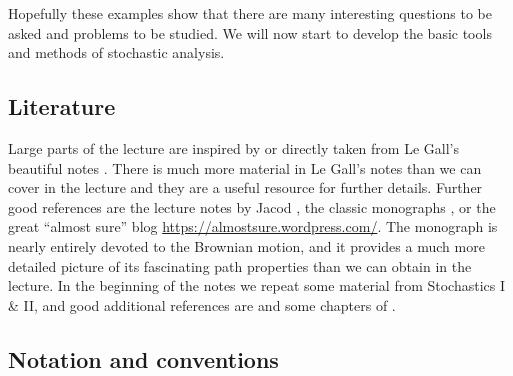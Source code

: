 \documentclass{article}
\newcommand{\1}{\1}
\begin{document}
Hopefully these examples show that there are many interesting questions to be
asked and problems to be studied. We will now start to develop the basic tools
and methods of stochastic analysis.

\subsection*{Literature}

Large parts of the lecture are inspired by or directly taken from Le Gall's
beautiful notes {\cite{LeGall2016}}. There is much more material in Le Gall's
notes than we can cover in the lecture and they are a useful resource for
further details. Further good references are the lecture notes by Jacod
{\cite{Jacod2008}}, the classic monographs
{\cite{Karatzas1988,Revuz1999,Oksendal2003,Jacod2003,Ethier1986}}, or the
great ``almost sure'' blog
\href{https://almostsure.wordpress.com/}{https://almostsure.wordpress.com/}.
The monograph {\cite{Morters2010}} is nearly entirely devoted to the Brownian
motion, and it provides a much more detailed picture of its fascinating path
properties than we can obtain in the lecture. In the beginning of the notes we
repeat some material from Stochastics I \& II, and good additional references
are {\cite{Klenke2008,Durrett2010,Stroock2011}} and some chapters of
{\cite{Ethier1986}}.

\subsection*{Notation and conventions}
\end{document}
